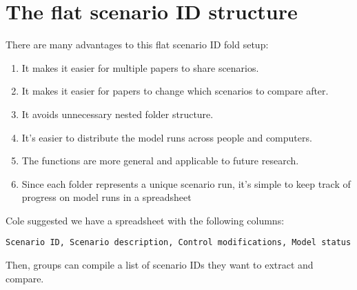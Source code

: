 \documentclass[12pt]{article}
\begin{document}
\section*{The flat scenario ID structure}
There are many advantages to this flat scenario ID fold setup:

\begin{enumerate}
  \item It makes it easier for multiple papers to share scenarios.

  \item It makes it easier for papers to change which scenarios to compare after.

  \item It avoids unnecessary nested folder structure.

  \item It's easier to distribute the model runs across people and computers.

  \item The functions are more general and applicable to future research.

  \item Since each folder represents a unique scenario run, it's simple to keep
    track of progress on model runs in a spreadsheet
  
\end{enumerate}

\noindent
Cole suggested we have a spreadsheet with the following columns:

\begin{verbatim}
Scenario ID, Scenario description, Control modifications, Model status
\end{verbatim}

\noindent
Then, groups can compile a list of scenario IDs they want to extract and compare.



%
\end{document}
